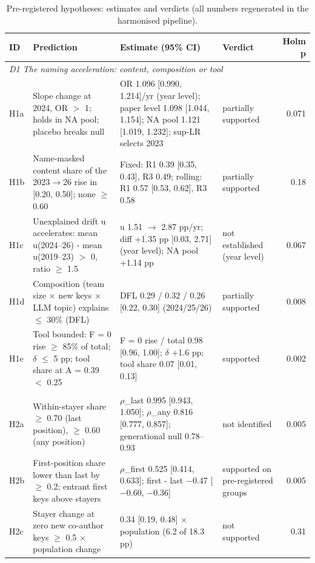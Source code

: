 \begin{table}[t]
\centering
\footnotesize
\caption{Pre-registered hypotheses: estimates and verdicts (all numbers regenerated in the harmonised pipeline).}
\label{tab:hypotheses}
\begin{tabular}{l p{3.9cm} p{5.7cm} p{2.3cm} r}
\toprule
ID & Prediction & Estimate (95\% CI) & Verdict & Holm p \\
\midrule
\multicolumn{5}{l}{\textit{D1 The naming acceleration: content, composition or tool}} \\
H1a & Slope change at 2024, OR $>$ 1; holds in NA pool; placebo breaks null & OR 1.096 [0.990, 1.214]/yr (year level); paper level 1.098 [1.044, 1.154]; NA pool 1.121 [1.019, 1.232]; sup-LR selects 2023 & partially supported & 0.071 \\
H1b & Name-masked content share of the 2023$\rightarrow$26 rise in [0.20, 0.50]; none $\geq$ 0.60 & Fixed: R1 0.39 [0.35, 0.43], R3 0.49; rolling: R1 0.57 [0.53, 0.62], R3 0.58 & partially supported & 0.18 \\
H1c & Unexplained drift u accelerates: mean u(2024--26) - mean u(2019--23) $>$ 0, ratio $\geq$ 1.5 & u 1.51 $\rightarrow$ 2.87 pp/yr; diff +1.35 pp [0.03, 2.71] (year level); NA pool +1.14 pp & not established (year level) & 0.067 \\
H1d & Composition (team size $\times$ new keys $\times$ LLM topic) explains $\leq$ 30\% (DFL) & DFL 0.29 / 0.32 / 0.26 [0.22, 0.30] (2024/25/26) & partially supported & 0.008 \\
H1e & Tool bounded: F = 0 rise $\geq$ 85\% of total; $\delta$ $\leq$ 5 pp; tool share at A = 0.39 $<$ 0.25 & F = 0 rise / total 0.98 [0.96, 1.00]; $\delta$ +1.6 pp; tool share 0.07 [0.01, 0.13] & supported & 0.002 \\
\addlinespace
\multicolumn{5}{l}{\textit{D2 Who carries the change (declared profile keys)}} \\
H2a & Within-stayer share $\geq$ 0.70 (last position), $\geq$ 0.60 (any position) & $\rho$\_last 0.995 [0.943, 1.050]; $\rho$\_any 0.816 [0.777, 0.857]; generational null 0.78--0.93 & not identified & 0.005 \\
H2b & First-position share lower than last by $\geq$ 0.2; entrant first keys above stayers & $\rho$\_first 0.525 [0.414, 0.633]; first - last $-$0.47 [$-$0.60, $-$0.36] & supported on pre-registered groups & 0.005 \\
H2c & Stayer change at zero new co-author keys $\geq$ 0.5 $\times$ population change & 0.34 [0.19, 0.48] $\times$ population (6.2 of 18.3 pp) & not supported & 0.31 \\

\end{tabular}
\end{table}
